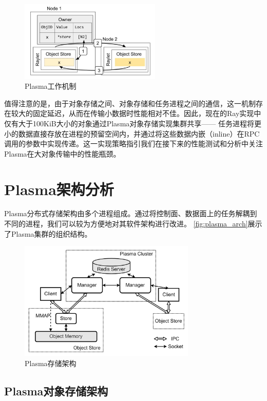 \begin{figure}[h] 
    \centering
    \includegraphics[width=0.6\textwidth]{image/chap02/object_fetch.png}
    \caption{Plasma工作机制}
    \label{fig:object_fetch}
\end{figure}

值得注意的是，由于对象存储之间、对象存储和任务进程之间的通信，这一机制存在较大的固定延迟，从而在传输小数据时性能相对不佳。因此，现在的Ray实现中仅有大于100KiB大小的对象通过Plasma对象存储实现集群共享——
任务进程将更小的数据直接存放在进程的预留空间内，并通过将这些数据内嵌（inline）在RPC调用的参数中实现传递。这一实现策略指引我们在接下来的性能测试和分析中关注Plasma在大对象传输中的性能瓶颈。

\section{Plasma架构分析}

Plasma分布式存储架构由多个进程组成。通过将控制面、数据面上的任务解耦到不同的进程，我们可以较为方便地对其软件架构进行改进。
\autoref{fig:plasma_arch}展示了Plasma集群的组织结构。

\begin{figure}[h] 
    \centering
    \includegraphics[width=0.75\textwidth]{image/chap02/plasma_arch.png}
    \caption{Plasma存储架构}
    \label{fig:plasma_arch}
\end{figure}

\subsection{Plasma对象存储架构}

